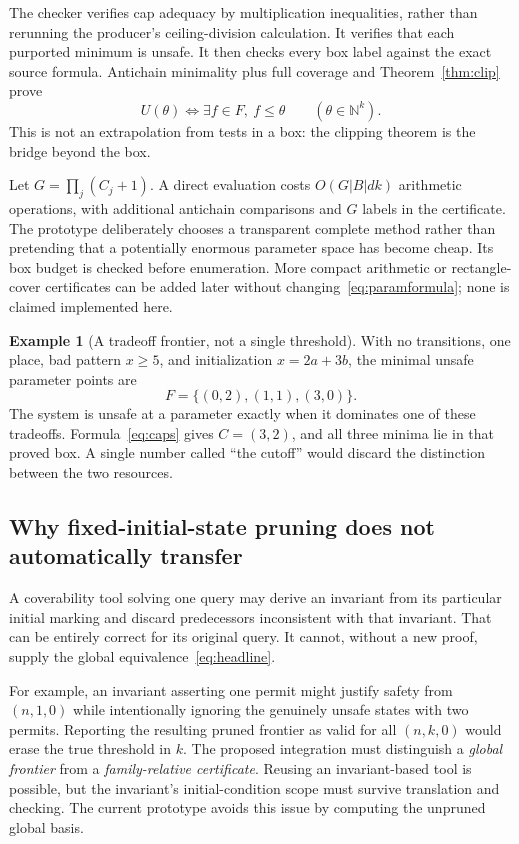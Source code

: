 \documentclass[11pt,a4paper]{article}
\newcommand{\N}{\mathbb N}
\theoremstyle{definition}
\newtheorem{example}[theorem]{Example}
\theoremstyle{remark}
\begin{document}
The checker verifies cap adequacy by multiplication inequalities, rather than rerunning the producer's ceiling-division calculation. It verifies that each purported minimum is unsafe. It then checks every box label against the exact source formula. Antichain minimality plus full coverage and Theorem~\ref{thm:clip} prove
\[
 U(\theta)\iff\exists f\in F,\ f\le\theta
 \qquad(\theta\in\N^k).
\]
This is not an extrapolation from tests in a box: the clipping theorem is the bridge beyond the box.

Let $G=\prod_j(C_j+1)$. A direct evaluation costs $O(G|B|dk)$ arithmetic operations, with additional antichain comparisons and $G$ labels in the certificate. The prototype deliberately chooses a transparent complete method rather than pretending that a potentially enormous parameter space has become cheap. Its box budget is checked before enumeration. More compact arithmetic or rectangle-cover certificates can be added later without changing~\eqref{eq:paramformula}; none is claimed implemented here.

\begin{example}[A tradeoff frontier, not a single threshold]
With no transitions, one place, bad pattern $x\ge5$, and initialization $x=2a+3b$, the minimal unsafe parameter points are
\[
 F=\{(0,2),(1,1),(3,0)\}.
\]
The system is unsafe at a parameter exactly when it dominates one of these tradeoffs. Formula~\eqref{eq:caps} gives $C=(3,2)$, and all three minima lie in that proved box. A single number called ``the cutoff'' would discard the distinction between the two resources.
\end{example}

\subsection{Why fixed-initial-state pruning does not automatically transfer}\label{sec:pruning}
A coverability tool solving one query may derive an invariant from its particular initial marking and discard predecessors inconsistent with that invariant. That can be entirely correct for its original query. It cannot, without a new proof, supply the global equivalence~\eqref{eq:headline}.

For example, an invariant asserting one permit might justify safety from $(n,1,0)$ while intentionally ignoring the genuinely unsafe states with two permits. Reporting the resulting pruned frontier as valid for all $(n,k,0)$ would erase the true threshold in $k$. The proposed integration must distinguish a \emph{global frontier} from a \emph{family-relative certificate}. Reusing an invariant-based tool is possible, but the invariant's initial-condition scope must survive translation and checking. The current prototype avoids this issue by computing the unpruned global basis.
\end{document}

